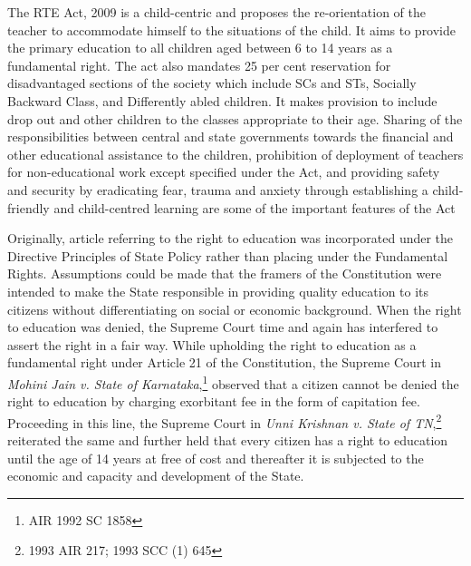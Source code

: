 \begin{multicols}{2}
\vspace{-.1cm}

\noi
The RTE Act, 2009 is a child-centric and proposes the re-orientation of the teacher to
accommodate himself to the situations of the child. It aims to provide the primary education
to all children aged between 6 to 14 years as a fundamental right. The act also mandates 25
per cent reservation for disadvantaged sections of the society which include SCs and STs,
Socially Backward Class, and Differently abled children. It makes provision to include drop
out and other children to the classes appropriate to their age. Sharing of the responsibilities
between central and state governments towards the financial and other educational assistance
to the children, prohibition of deployment of teachers for non-educational work except
specified under the Act, and providing safety and security by eradicating fear, trauma and
anxiety through establishing a child-friendly and child-centred learning are some of the
important features of the Act

\vspace{-.1cm}


\vspace{-.1cm}

\noi
Originally, article referring to the right to education was incorporated under the Directive
Principles of State Policy rather than placing under the Fundamental Rights. Assumptions
could be made that the framers of the Constitution were intended to make the State
responsible in providing quality education to its citizens without differentiating on social or
economic background. When the right to education was denied, the Supreme Court time and
again has interfered to assert the right in a fair way. While upholding the right to education as
a fundamental right under Article 21 of the Constitution, the Supreme Court in \textit{Mohini Jain v. State of Karnataka},\footnote{AIR 1992 SC 1858} observed that a citizen cannot be denied the right to education by
charging exorbitant fee in the form of capitation fee. Proceeding in this line, the Supreme
Court in \textit{Unni Krishnan v. State of TN},\footnote{1993 AIR 217; 1993 SCC (1) 645} reiterated the same and further held that every
citizen has a right to education until the age of 14 years at free of cost and thereafter it is
subjected to the economic and capacity and development of the State.


\end{multicols}
